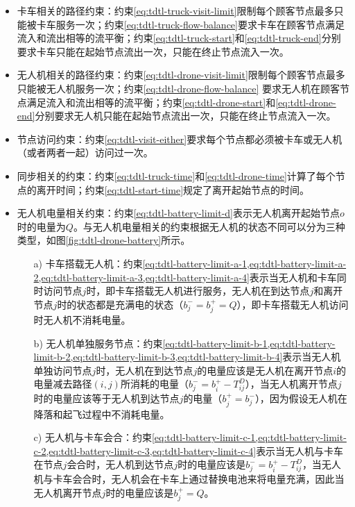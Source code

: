 \begin{itemize}
    \item \colorbox{shallow-purple}{卡车相关的路径约束：}约束\ref{eq:tdtl-truck-visit-limit}限制每个顾客节点最多只能被卡车服务一次；约束\ref{eq:tdtl-truck-flow-balance}要求卡车在顾客节点满足流入和流出相等的流平衡；约束\ref{eq:tdtl-truck-start}和\ref{eq:tdtl-truck-end}分别要求卡车只能在起始节点流出一次，只能在终止节点流入一次。
    \item \colorbox{shallow-red}{无人机相关的路径约束：}约束\ref{eq:tdtl-drone-visit-limit}限制每个顾客节点最多只能被无人机服务一次；约束\ref{eq:tdtl-drone-flow-balance} 要求无人机在顾客节点满足流入和流出相等的流平衡；约束\ref{eq:tdtl-drone-start}和\ref{eq:tdtl-drone-end}分别要求无人机只能在起始节点流出一次，只能在终止节点流入一次。
    \item \colorbox{shallow-green}{节点访问约束：}约束\ref{eq:tdtl-visit-either}要求每个节点都必须被卡车或无人机（或者两者一起）访问过一次。
    \item \colorbox{shallow-yellow}{同步相关的约束：}约束\ref{eq:tdtl-truck-time}和\ref{eq:tdtl-drone-time}计算了每个节点的离开时间；约束\ref{eq:tdtl-start-time}规定了离开起始节点的时间。
    \item \colorbox{shallow-blue}{无人机电量相关约束：}约束\ref{eq:tdtl-battery-limit-d}表示无人机离开起始节点$o$时的电量为$Q$。与无人机电量相关的约束根据无人机的状态不同可以分为三种类型，如图\ref{fig:tdtl-drone-battery}所示。
    \begin{itemize}
        \item[a)] 卡车搭载无人机：约束\cref{eq:tdtl-battery-limit-a-1,eq:tdtl-battery-limit-a-2,eq:tdtl-battery-limit-a-3,eq:tdtl-battery-limit-a-4}表示当无人机和卡车同时访问节点$j$时，即卡车搭载无人机进行服务，无人机在到达节点$j$和离开节点$j$时的状态都是充满电的状态（$b_j^-=b_j^+=Q$），即卡车搭载无人机访问时无人机不消耗电量。
        \item[b)] 无人机单独服务节点：约束\cref{eq:tdtl-battery-limit-b-1,eq:tdtl-battery-limit-b-2,eq:tdtl-battery-limit-b-3,eq:tdtl-battery-limit-b-4}表示当无人机单独访问节点$j$时，无人机在到达节点$j$的电量应该是无人机在离开节点$i$的电量减去路径$(i, j)$所消耗的电量（$b_j^-=b_i^+-T_{ij}^D$），当无人机离开节点$j$时的电量应该等于无人机到达节点$j$的电量（$b_j^+=b_j^-$），因为假设无人机在降落和起飞过程中不消耗电量。
        \item[c)] 无人机与卡车会合：约束\cref{eq:tdtl-battery-limit-c-1,eq:tdtl-battery-limit-c-2,eq:tdtl-battery-limit-c-3,eq:tdtl-battery-limit-c-4}表示当无人机与卡车在节点$j$会合时，无人机到达节点$j$时的电量应该是$b_j^- = b_i^+ - T_{ij}^D$，当无人机与卡车会合时，无人机会在卡车上通过替换电池来将电量充满，因此当无人机离开节点$j$时的电量应该是$b_j^+ = Q$。
    \end{itemize}

\end{itemize}

